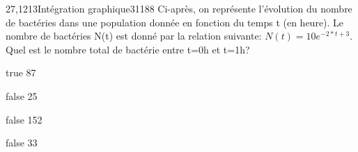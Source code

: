           \begin{question}{27,1213}{Intégration graphique}{3}{1188}
             Ci-après, on représente l'évolution du nombre de bactéries dans une population donnée en fonction du temps t (en heure). Le nombre de bactéries N(t) est donné par la relation suivante: $ N(t) =10e^{-2*t+3} $. Quel est le nombre total de bactérie entre t=0h et t=1h?
            \begin{figure}
             \end{figure}
        \end{question}
        \begin{reponses}
            \item[true] 87
		    \item[false] 25
		    \item[false] 152
		    \item[false] 33
		    \end{reponses}
